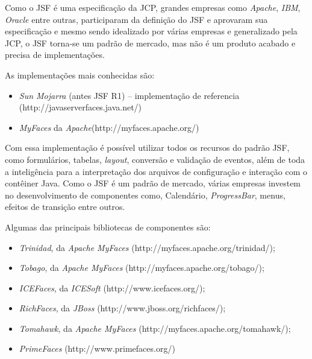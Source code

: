  \par Como o JSF é uma especificação da JCP, grandes empresas como
 \textit{Apache}, \textit{IBM}, \textit{Oracle} entre outras, participaram da
 definição do JSF e aprovaram sua especificação e mesmo sendo idealizado por várias empresas e generalizado pela
 JCP, o JSF torna-se um padrão de mercado, mas não é um produto acabado e precisa
 de implementações.\cite{livro_programacao_java_para_web}
 
 \par As implementações mais conhecidas são:
 
  \begin{itemize}
 	\item \textit{Sun Mojarra} (antes JSF R1) – implementação de referencia
 	(http://javaserverfaces.java.net/)
 	
 	\item \textit{MyFaces} da \textit{Apache}(http://myfaces.apache.org/)
  \end{itemize}
 
 \par Com essa implementação é possível utilizar todos os recursos do padrão JSF,
 como formulários, tabelas, \textit{layout}, conversão e validação de eventos,
 além de toda a inteligência para a interpretação dos arquivos de configuração e
 interação com o contêiner Java. Como o JSF é um padrão de mercado, várias empresas investem no
 desenvolvimento de componentes como, Calendário, \textit{ProgressBar}, menus,
 efeitos de transição entre outros.\cite{livro_programacao_java_para_web}
 
  \par Algumas das principais bibliotecas de componentes são:
 
  \begin{itemize}
 	\item \textit{Trinidad}, da \textit{Apache MyFaces}
 	(http://myfaces.apache.org/trinidad/);
 	
 	\item \textit{Tobago}, da \textit{Apache MyFaces}
 	(http://myfaces.apache.org/tobago/);
 	
 	\item \textit{ICEFaces}, da \textit{ICESoft} (http://www.icefaces.org/);
 	
 	\item \textit{RichFaces}, da \textit{JBoss} (http://www.jboss.org/richfaces/);
 	
 	\item \textit{Tomahawk}, da \textit{Apache MyFaces}
 	(http://myfaces.apache.org/tomahawk/);
 	
 	\item \textit{PrimeFaces} (http://www.primefaces.org/)
  \end{itemize}
 
